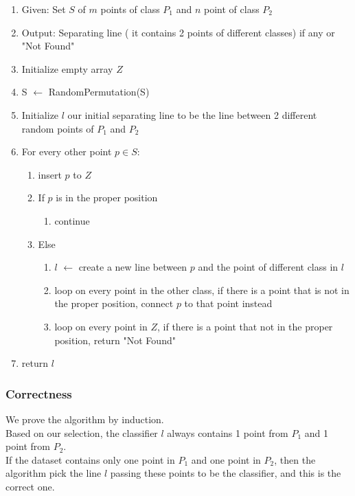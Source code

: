 \begin{enumerate}
\item Given: Set $S$ of $m$ points of class $P_1$ and $n$ point of class $P_2$  
\item Output: Separating line ( it contains 2 points of different classes) if any or "Not Found"

\item Initialize empty array $Z$
\item S $\leftarrow$ RandomPermutation(S) 
\item Initialize $l$ our initial separating line to be the line between 2 different random points of $P_1$ and $P_2$
\item For every other point  $p  \in S$:
\begin{enumerate}
    \item insert $p$ to $Z$
\item If $p$ is in the proper position
\begin{enumerate}
\item continue 
\end{enumerate}
\item Else  
   \begin{enumerate}
\item $l$  $\leftarrow$ create a new line between $p$ and the point of different class in $l$ 
\item loop on every point in the other class, if there is a point that is not in the proper position, connect $p$ to that point instead
\item loop on every point in $Z$, if there is a point that not in the proper position, return "Not Found"

\end{enumerate}    
        
\end{enumerate}

\item return $l$
\end{enumerate}

\subsubsection*{Correctness}
We prove the algorithm by induction. \\ 

Based on our selection, the classifier $l$ always contains 1 point from $P_1$ and 1 point from $P_2$. \\

If the dataset contains only one point in $P_1$ and one point in $P_2$, then the algorithm pick the line $l$ passing these points to be the classifier, and this is the correct one. \\

